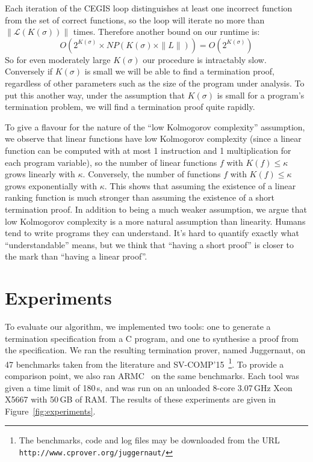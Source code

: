 \documentclass[preprint]{sigplanconf}
\theoremstyle{definition}
\begin{document}
Each iteration of the CEGIS loop distinguishes at least one incorrect function from the set of correct
functions, so the loop will iterate no more than $\| \mathcal{L}(K(\sigma)) \|$ times.
Therefore another bound on our runtime is:
$$O\left (2^{K(\sigma)} \times NP \left ( K(\sigma) \times \| L \| \right) \right) = O \left(2^{K(\sigma)} \right)$$
So for even moderately large $K(\sigma)$ our procedure is intractably slow.  Conversely
if $K(\sigma)$ is small we will be able to find a termination proof, regardless of other parameters
such as the size of the program under analysis.  To put this another way, under the assumption
that $K(\sigma)$ is small for a program's termination problem, we will find a termination proof
quite rapidly.

To give a flavour for the nature of the ``low Kolmogorov complexity'' assumption, 
we observe that linear functions have low Kolmogorov complexity (since a linear function can
be computed with at most 1 instruction and 1 multiplication for each program variable),
so the number of linear functions $f$ with $K(f) \leq \kappa$ grows linearly with $\kappa$.
Conversely, the number of functions $f$ with $K(f) \leq \kappa$
grows exponentially with $\kappa$.  This shows that assuming the existence of a linear
ranking function is much stronger than assuming the existence of a short
termination proof.  In addition to being a much weaker assumption,
we argue that low Kolmogorov complexity is a more natural assumption than
linearity.  Humans tend to write programs they can understand.  It's hard
to quantify exactly what ``understandable'' means, but we think that
``having a short proof'' is closer to the mark than ``having a linear proof''.


\section{Experiments}

To evaluate our algorithm, we implemented two tools: one to generate a
termination specification from a C program, and one to synthesise a proof
from the specification.  We ran the resulting termination prover,
named {\sc Juggernaut}, on 47
benchmarks taken from the literature and SV-COMP'15~\cite{svcomp15}\footnote{
The benchmarks, code and log files may be downloaded from the URL \texttt{http://www.cprover.org/juggernaut/}}.  To
provide a comparison point, we also ran {\sc ARMC}~\cite{armc-website} on
the same benchmarks.  Each tool was given a time limit of 180\,s, and was
run on an unloaded 8-core 3.07\,GHz Xeon X5667 with 50\,GB of RAM.  The
results of these experiments are given in Figure~\ref{fig:experiments}.
\end{document}
